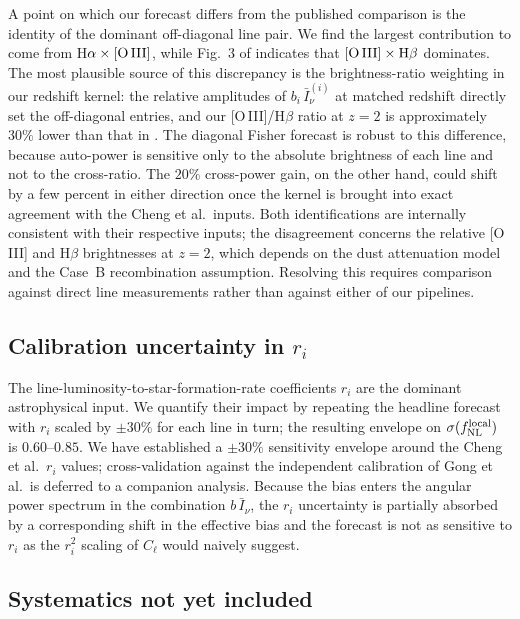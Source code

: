 \documentclass[twocolumn,prd,nofootinbib,superscriptaddress,floatfix,11pt]{revtex4-2}
\begin{document}
A point on which our forecast differs from the published comparison is the identity of the dominant off-diagonal line pair.  We find the largest contribution to come from H$\alpha\times{\rm[O\,III]}$, while Fig.~3 of \citet{Cheng2024} indicates that ${\rm[O\,III]}\times{\rm H}\beta$ dominates.  The most plausible source of this discrepancy is the brightness-ratio weighting in our redshift kernel: the relative amplitudes of $b_i\,\bar{I}_\nu^{(i)}$ at matched redshift directly set the off-diagonal entries, and our [O\,III]/H$\beta$ ratio at $z=2$ is approximately $30\%$ lower than that in \citet{Cheng2024}.  The diagonal Fisher forecast is robust to this difference, because auto-power is sensitive only to the absolute brightness of each line and not to the cross-ratio.  The $20\%$ cross-power gain, on the other hand, could shift by a few percent in either direction once the kernel is brought into exact agreement with the Cheng et al.\ inputs.  Both identifications are internally consistent with their respective inputs; the disagreement concerns the relative [O\,III] and H$\beta$ brightnesses at $z=2$, which depends on the dust attenuation model and the Case~B recombination assumption. Resolving this requires comparison against direct line measurements rather than against either of our pipelines.

\subsection{Calibration uncertainty in \texorpdfstring{$r_i$}{ri}}

The line-luminosity-to-star-formation-rate coefficients $r_i$ are the dominant astrophysical input.  We quantify their impact by repeating the headline forecast with $r_i$ scaled by $\pm 30\%$ for each line in turn; the resulting envelope on $\sigma(f_{\rm NL}^{\rm local})$ is $0.60$--$0.85$.  We have established a $\pm 30\%$ sensitivity envelope around the Cheng et al.\ $r_i$ values; cross-validation against the independent calibration of Gong et al.\ is deferred to a companion analysis.  Because the bias enters the angular power spectrum in the combination $b\,\bar{I}_\nu$, the $r_i$ uncertainty is partially absorbed by a corresponding shift in the effective bias and the forecast is not as sensitive to $r_i$ as the $r_i^2$ scaling of $C_\ell$ would naively suggest.

\subsection{Systematics not yet included}
\end{document}
